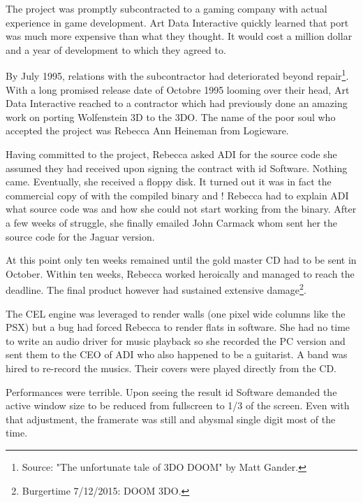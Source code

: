 The project was promptly subcontracted to a gaming company with actual experience in game development. Art Data Interactive quickly learned that port was much more expensive than what they thought. It would cost a million dollar and a year of development to which they agreed to.\\
\par
By July 1995, relations with the subcontractor had deteriorated beyond repair\footnote{Source: "The unfortunate tale of 3DO DOOM" by Matt Gander.}. With a long promised release date of Octobre 1995 looming over their head, Art Data Interactive reached to a contractor which had previously done an amazing work on porting Wolfenstein 3D to the 3DO. The name of the poor soul who accepted the project was Rebecca Ann Heineman from Logicware.\\
\par
Having committed to the project, Rebecca asked ADI for the source code she assumed they had received upon signing the contract with id Software. Nothing came. Eventually, she received a floppy disk. It turned out it was in fact the commercial copy of \doom with the compiled binary  and ! Rebecca had to explain ADI what source code was and how she could not start working from the binary. After a few weeks of struggle, she finally emailed John Carmack whom sent her the source code for the Jaguar version.\\
\par
 At this point only ten weeks remained until the gold master CD had to be sent in October. Within ten weeks, Rebecca worked heroically and managed to reach the deadline. The final product however had sustained extensive damage\footnote{Burgertime 7/12/2015: DOOM 3DO.}.\\
\par
{}
\par
The CEL engine was leveraged to render walls (one pixel wide columns like the PSX) but a bug had forced Rebecca to render flats in software. She had no time to write an audio driver for music playback so she recorded the PC version and sent them to the CEO of ADI who also happened to be a guitarist. A band was hired to re-record the musics. Their covers were played directly from the CD.\\ 
\par
 Performances were terrible. Upon seeing the result id Software demanded the active window size to be reduced from fullscreen to 1/3 of the screen. Even with that adjustment, the framerate was still and abysmal single digit most of the time.\\

